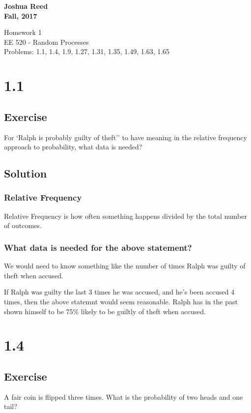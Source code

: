 \documentclass[12pt]{article}
\begin{document}
{%
  \large \bfseries 
  Joshua Reed \\
  Fall, 2017 \\
  \begin{center}
    {\huge Homework 1}\\
    EE 520 - Random Processes \\%
  \normalsize Problems: 1.1, 1.4, 1.9, 1.27, 1.31, 1.35, 1.49, 1.63, 1.65
  \end{center}}
 
 
\section{1.1} 
\subsection{Exercise}
For `Ralph is probably guilty of theft'' to have meaning in the relative frequency 
approach to probability, what data is needed?

\subsection{Solution}
\subsubsection{Relative Frequency}
Relative Frequency is how often something happens divided by the total number of outcomes.

\subsubsection{What data is needed for the above statement?}
We would need to know something like the number of times Ralph was guilty of theft when accused. 

If Ralph was guilty the last 3 times he was accused, and he's been accused 4 times, then the 
above statemnt would seem reasonable. Ralph has in the past shown himself to be 75\% likely 
to be guiltly of theft when accused.

\section{1.4} 
\subsection{Exercise}
A fair coin is flipped three times. What is the probability of two heads and one tail?
\end{document}
